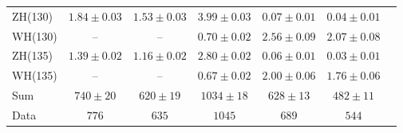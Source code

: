 \documentclass[11pt,twoside,a4paper,cmspaper,final,collab]{cms-tdr}
\begin{document}
\begin{table}[tbp]
\begin{center}
{\begin{tabular}{lcccccc}
ZH(130) &  $1.84 \pm 0.03$ & $1.53 \pm 0.03$ & $3.99\pm 0.03$ &  $0.07 \pm 0.01$ &  $0.04 \pm 0.01$ \\
WH(130) &  -- & -- & $0.70\pm 0.02$ & $2.56 \pm 0.09$ & $2.07 \pm 0.08$ \\
ZH(135) &  $1.39 \pm 0.02$ &  $1.16 \pm 0.02$ & $2.80\pm 0.02$ &  $0.06 \pm 0.01$ &  $0.03 \pm 0.01$ \\
WH(135) &  -- & -- & $0.67\pm 0.02$ & $2.00 \pm 0.06$ & $1.76 \pm 0.06$ \\
\hline
Sum &$740 \pm 20$&$620 \pm 19$ & $1034 \pm 18$ & $628\pm 13$ &$482\pm 11$\\\hline
Data &    $776$ &$635$ & $1045$ &  $689$ & $544$\\
\hline
\end{tabular}
}
\end{center}
\end{table}
\end{document}
